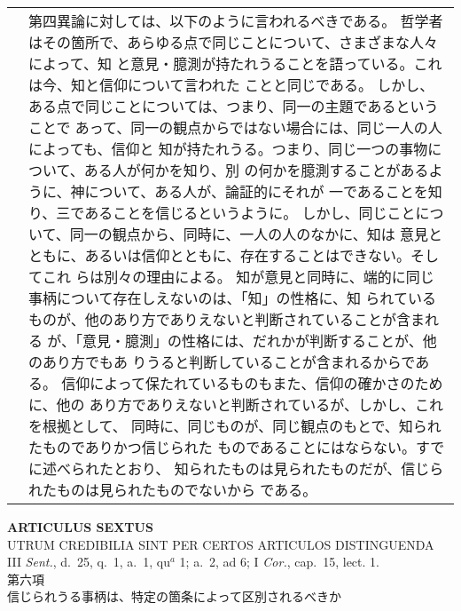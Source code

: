 \documentclass[10pt]{jsarticle} %
\begin{document}
\begin{longtable}{p{21em}p{21em}}
&

第四異論に対しては、以下のように言われるべきである。
哲学者はその箇所で、あらゆる点で同じことについて、さまざまな人々によって、知
 と意見・臆測が持たれうることを語っている。これは今、知と信仰について言われた
 ことと同じである。
しかし、ある点で同じことについては、つまり、同一の主題であるということで
 あって、同一の観点からではない場合には、同じ一人の人によっても、信仰と
 知が持たれうる。つまり、同じ一つの事物について、ある人が何かを知り、別
 の何かを臆測することがあるように、神について、ある人が、論証的にそれが
 一であることを知り、三であることを信じるというように。
しかし、同じことについて、同一の観点から、同時に、一人の人のなかに、知は
 意見とともに、あるいは信仰とともに、存在することはできない。そしてこれ
 らは別々の理由による。
知が意見と同時に、端的に同じ事柄について存在しえないのは、「知」の性格に、知
 られているものが、他のあり方でありえないと判断されていることが含まれる
 が、「意見・臆測」の性格には、だれかが判断することが、他のあり方でもあ
 りうると判断していることが含まれるからである。
信仰によって保たれているものもまた、信仰の確かさのために、他の
 あり方でありえないと判断されているが、しかし、これを根拠として、
 同時に、同じものが、同じ観点のもとで、知られたものでありかつ信じられた
 ものであることにはならない。すでに述べられたとおり、
 知られたものは見られたものだが、信じられたものは見られたものでないから
 である。



\end{longtable}

\newpage


\begin{center}
 {\Large {\bf ARTICULUS SEXTUS}}\\
 {\large UTRUM CREDIBILIA SINT PER CERTOS ARTICULOS DISTINGUENDA}\\
 {\footnotesize III {\itshape Sent.}, d.~25, q.~1, a.~1, qu$^a$ 1; a.~2,
 ad 6; I {\itshape Cor.}, cap.~15, lect. 1.}\\
 {\Large 第六項\\信じられうる事柄は、特定の箇条によって区別されるべきか}
\end{center}
\end{document}
